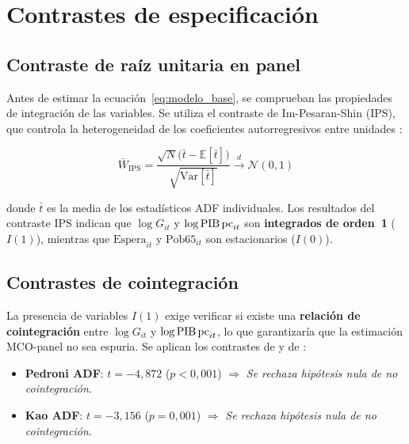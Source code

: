\section{Contrastes de especificación}
\label{sec:especificacion}

\subsection{Contraste de raíz unitaria en panel}

Antes de estimar la ecuación~\eqref{eq:modelo_base}, se comprueban las
propiedades de integración de las variables. Se utiliza el contraste de
Im-Pesaran-Shin (IPS), que controla la heterogeneidad de los coeficientes
autorregresivos entre unidades \parencite{Im2003}:

\begin{equation}
  \bar{W}_{\text{IPS}} =
  \frac{\sqrt{N}\bigl(\bar{t} - \mathbb{E}[\bar{t}]\bigr)}
       {\sqrt{\text{Var}[\bar{t}]}}
  \xrightarrow{d} \mathcal{N}(0,1)
  \label{eq:ips}
\end{equation}

donde $\bar{t}$ es la media de los estadísticos ADF individuales. Los resultados
del contraste IPS indican que $\log G_{it}$ y $\log\text{PIB\,pc}_{it}$ son
\textbf{integrados de orden~1} ($I(1)$), mientras que $\text{Espera}_{it}$ y
$\text{Pob65}_{it}$ son estacionarios ($I(0)$).

\subsection{Contrastes de cointegración}

La presencia de variables $I(1)$ exige verificar si existe una \textbf{relación
de cointegración} entre $\log G_{it}$ y $\log\text{PIB\,pc}_{it}$, lo que
garantizaría que la estimación MCO-panel no sea espuria. Se aplican los
contrastes de \textcite{Pedroni1999, Pedroni2004} y de \textcite{Kao1999}:

\begin{itemize}
  \item \textbf{Pedroni ADF}: $t = -4{,}872$ ($p < 0{,}001$) $\Rightarrow$
    \textit{Se rechaza hipótesis nula de no cointegración}.
  \item \textbf{Kao ADF}: $t = -3{,}156$ ($p = 0{,}001$) $\Rightarrow$
    \textit{Se rechaza hipótesis nula de no cointegración}.
\end{itemize}

